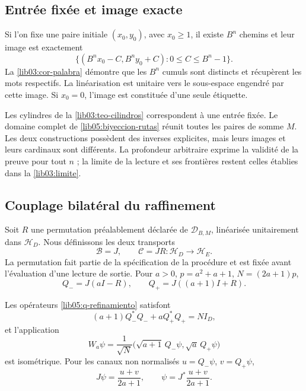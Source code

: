 \subsection{Entrée fixée et image exacte}
\label{lib05:entrada-fija}

Si l'on fixe une paire initiale \((x_0,y_0)\), avec \(x_0\geq1\), il existe \(B^n\) chemins et leur image est exactement
\begin{equation}
 \bigl\{(B^nx_0-C,B^ny_0+C):0\leq C\leq B^n-1\bigr\}.
 \label{lib05:imagen-fija}
\end{equation}
La \cref{lib03:cor-palabra} démontre que les \(B^n\) cumuls sont distincts et récupèrent les mots respectifs. La linéarisation est unitaire vers le sous-espace engendré par cette image. Si \(x_0=0\), l'image est constituée d'une seule étiquette.

Les cylindres de la \cref{lib03:teo-cilindros} correspondent à une
entrée fixée. Le domaine complet de
\eqref{lib05:biyeccion-rutas} réunit toutes les paires de somme \(M\).
Les deux constructions possèdent des inverses explicites, mais leurs images
et leurs cardinaux sont différents. La profondeur arbitraire exprime la
validité de la preuve pour tout \(n\) ; la limite de la lecture et
ses frontières restent celles établies dans la
\cref{lib03:limite}.

\subsection{Couplage bilatéral du raffinement}
\label{lib05:bilateral}

Soit \(R\) une permutation préalablement déclarée de
\(\mathcal D_{B,M}\), linéarisée unitairement dans
\(\mathscr H_D\). Nous définissons les deux transports
\begin{equation}
 \mathcal B=J,\qquad \mathcal C=JR:
            \mathscr H_D\longrightarrow\mathscr H_E.
 \label{lib05:dos-transportes}
\end{equation}
La permutation fait partie de la spécification de la procédure et est fixée avant l'évaluation d'une lecture de sortie. Pour \(a>0\), \(p=a^2+a+1\), \(N=(2a+1)p\),
\begin{equation}
 Q_-=J(aI-R),\qquad Q_+=J((a+1)I+R).
 \label{lib05:q-refinamiento}
\end{equation}

\begin{proposition}
\label{lib05:prop-bilateral}
Les opérateurs \eqref{lib05:q-refinamiento} satisfont
\begin{equation}
 (a+1)Q_-^*Q_-+aQ_+^*Q_+=NI_D,
 \label{lib05:balance}
\end{equation}
et l’application
\begin{equation}
 W_a\psi=\frac1{\sqrt N}
    \bigl(\sqrt{a+1}\,Q_-\psi,\sqrt a\,Q_+\psi\bigr)
 \label{lib05:w}
\end{equation}
est isométrique. Pour les canaux non normalisés \(u=Q_-\psi\), \(v=Q_+\psi\),
\begin{equation}
 J\psi=\frac{u+v}{2a+1},\qquad
 \psi=J^*\frac{u+v}{2a+1}.
 \label{lib05:inversa-bilateral}
\end{equation}
\end{proposition}

